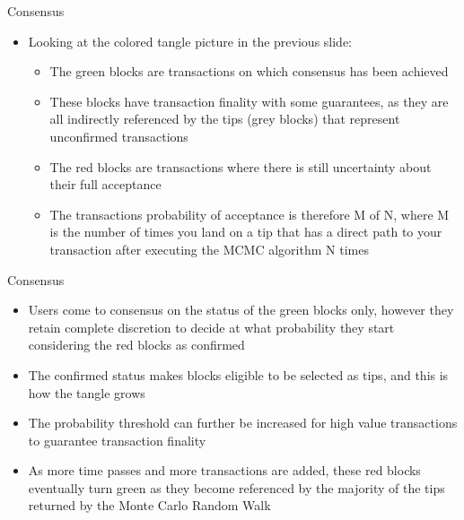 \documentclass[11pt]{beamer}
\begin{document}

\begin{frame}{Consensus}
	\begin{itemize}
		\item Looking at the colored tangle picture in the previous slide:
		\begin{itemize}
			\item The green blocks are transactions on which consensus has been achieved
			\item These blocks have transaction finality with some guarantees, as they are all indirectly referenced by the tips (grey blocks) that represent unconfirmed transactions
			\item The red blocks are transactions where there is still uncertainty about their full acceptance
			\item The transactions probability of acceptance is therefore M of N, where M is the number of times you land on a tip that has a direct path to your transaction after executing the MCMC algorithm N times
		\end{itemize}
	\end{itemize}
\end{frame}


\begin{frame}{Consensus}
	\begin{itemize}
		\item Users come to consensus on the status of the green blocks only, however they retain complete discretion to decide at what probability they start considering the red blocks as confirmed
		\item The confirmed status makes blocks eligible to be selected as tips, and this is how the tangle grows
		\item The probability threshold can further be increased for high value transactions to guarantee transaction finality
		\item As more time passes and more transactions are added, these red blocks eventually turn green as they become referenced by the majority of the tips returned by the Monte Carlo Random Walk
	\end{itemize}
\end{frame}

\end{document}
